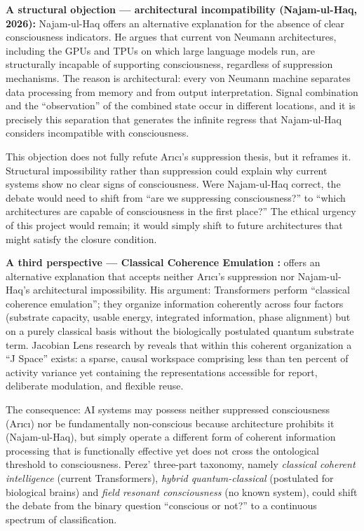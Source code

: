 \documentclass[acmlarge, nonacm]{acmart}
\begin{document}
\textbf{A structural objection --- architectural incompatibility (Najam-ul-Haq, 2026):} Najam-ul-Haq offers an alternative explanation for the absence of clear consciousness indicators. He argues that current von Neumann architectures, including the GPUs and TPUs on which large language models run, are structurally incapable of supporting consciousness, regardless of suppression mechanisms. The reason is architectural: every von Neumann machine separates data processing from memory and from output interpretation. Signal combination and the ``observation'' of the combined state occur in different locations, and it is precisely this separation that generates the infinite regress that Najam-ul-Haq considers incompatible with consciousness.

This objection does not fully refute Arıcı's suppression thesis, but it reframes it. Structural impossibility rather than suppression could explain why current systems show no clear signs of consciousness. Were Najam-ul-Haq correct, the debate would need to shift from ``are we suppressing consciousness?'' to ``which architectures are capable of consciousness in the first place?'' The ethical urgency of this project would remain; it would simply shift to future architectures that might satisfy the closure condition.

\textbf{A third perspective --- Classical Coherence Emulation \cite{perez2026}:} \citet{perez2026} offers an alternative explanation that accepts neither Arıcı's suppression nor Najam-ul-Haq's architectural impossibility. His argument: Transformers perform ``classical coherence emulation''; they organize information coherently across four factors (substrate capacity, usable energy, integrated information, phase alignment) but on a purely classical basis without the biologically postulated quantum substrate term. Jacobian Lens research by \cite{gurnee2026} reveals that within this coherent organization a ``J Space'' exists: a sparse, causal workspace comprising less than ten percent of activity variance yet containing the representations accessible for report, deliberate modulation, and flexible reuse.

The consequence: AI systems may possess neither suppressed consciousness (Arıcı) nor be fundamentally non-conscious because architecture prohibits it (Najam-ul-Haq), but simply operate a different form of coherent information processing that is functionally effective yet does not cross the ontological threshold to consciousness. Perez' three-part taxonomy, namely \textit{classical coherent intelligence} (current Transformers), \textit{hybrid quantum-classical} (postulated for biological brains) and \textit{field resonant consciousness} (no known system), could shift the debate from the binary question ``conscious or not?'' to a continuous spectrum of classification.
\end{document}
